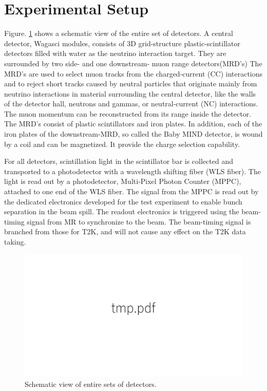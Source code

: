 \section{Experimental Setup}
Figure. \ref{fig:all_detector} shows a schematic view of the entire set of detectors.
A central detector, Wagasci modules, consists of 3D grid-structure plastic-scintillator detectors filled with water as the neutrino interaction target.
They are surrounded by two side- and one downstream- muon range detectors(MRD's)
The MRD's are used to select muon tracks from the charged-current (CC) interactions 
and to reject short tracks caused by neutral particles 
that originate mainly from neutrino interactions in material surrounding the central detector, like the walls of the detector hall,
neutrons and gammas, or neutral-current (NC) interactions.
The muon momentum can be reconstructed from its range inside the detector.
The MRD's consist of plastic scintillators and iron plates.
In addition, each of the iron plates of the downstream-MRD, so called the Baby MIND detector, is wound by a coil and
can be magnetized. It provide the charge selection capability.

For all detectors, scintillation light in the scintillator bar is collected and transported to a photodetector with a wavelength shifting fiber (WLS fiber).
The light is read out by a photodetector, Multi-Pixel Photon Counter (MPPC), attached to one end of the WLS fiber.
The signal from the MPPC is read out by the dedicated electronics developed for the test experiment
to enable bunch separation in the beam spill.
The readout electronics is triggered using the beam-timing signal from MR to synchronize to the beam.
The beam-timing signal is branched from those for T2K, and will not cause any effect on the T2K data taking.

\begin{figure}[tbh]
\begin{center}
\includegraphics[width=0.8\linewidth]{fig/tmp.pdf}
\end{center}
\caption{
Schematic view of entire sets of detectors.
}
\label{fig:all_detector}
\end{figure}

